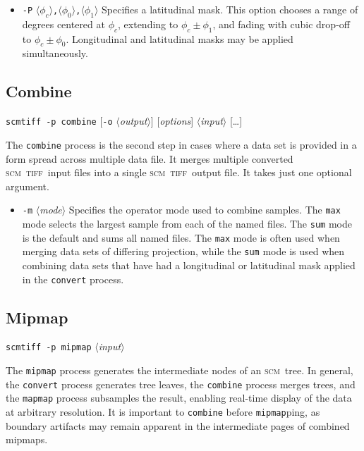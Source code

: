 \documentclass[oneside,11pt]{memoir}
\newcommand{\scm}     {\textsc{scm}}
\newcommand{\tiff}    {\textsc{tiff}}
\newcommand{\scmtiff} {\texttt{scmtiff}}
\newcommand{\inangles}[1]{$\langle$#1$\rangle$}
\newenvironment{optionlist}
  {\setlength{\leftmargini}{1in}\begin{itemize}}{\end{itemize}}
\begin{document}
\begin{Spacing}{1.1}
\begin{optionlist}
\item[\texttt{-P} \inangles{$\phi_c$}\texttt{,}\inangles{$\phi_0$}\texttt{,}\inangles{$\phi_1$}] Specifies a latitudinal mask. This option chooses a range of degrees centered at $\phi_c$, extending to $\phi_c\pm\phi_1$, and fading with cubic drop-off to $\phi_c\pm\phi_0$. Longitudinal and latitudinal masks may be applied simultaneously.
\end{optionlist}

\subsection{Combine}

\noindent\scmtiff\ \texttt{-p combine} [\texttt{-o} \inangles{\textit{output}}] [\textit{options}] \inangles{\textit{input}} [\ldots]

\bigskip The \texttt{combine} process is the second step in cases where a data set is provided in a form spread across multiple data file. It merges multiple converted \scm\ \tiff\ input files into a single \scm\ \tiff\ output file. It takes just one optional argument.

\begin{optionlist}
\item[\texttt{-m} \inangles{\textit{mode}}] Specifies the operator mode used to combine samples. The \texttt{max} mode selects the largest sample from each of the named files. The \texttt{sum} mode is the default and sums all named files. The \texttt{max} mode is often used when merging data sets of differing projection, while the \texttt{sum} mode is used when combining data sets that have had a longitudinal or latitudinal mask applied in the \texttt{convert} process.
\end{optionlist}

\subsection{Mipmap}

\noindent\scmtiff\ \texttt{-p mipmap} \inangles{\textit{input}}

\bigskip The \texttt{mipmap} process generates the intermediate nodes of an \scm\ tree. In general, the \texttt{convert} process generates tree leaves, the \texttt{combine} process merges trees, and the \texttt{mapmap} process subsamples the result, enabling real-time display of the data at arbitrary resolution. It is important to \texttt{combine} before \texttt{mipmap}ping, as boundary artifacts may remain apparent in the intermediate pages of combined mipmaps.


\end{Spacing}
\end{document}
